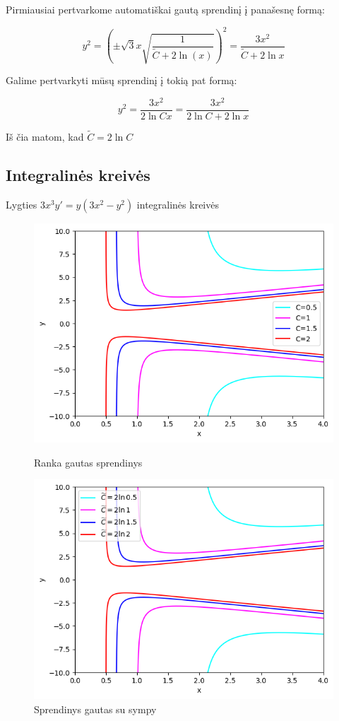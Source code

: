 \documentclass[11pt]{article}
\begin{document}
Pirmiausiai pertvarkome automatiškai gautą sprendinį į panašesnę formą:

\begin{equation}
y^2=\left(\pm\sqrt 3x\sqrt{\frac{1}{\widetilde{C}+2\ln(x)}}\right)^2=\frac{3x^2}{\widetilde{C}+2\ln x}
\end{equation}

Galime pertvarkyti mūsų sprendinį į tokią pat formą:

\begin{equation}
y^2=\frac{3x^2}{2\ln Cx}=\frac{3x^2}{2\ln C + 2\ln x}
\end{equation}

Iš čia matom, kad $\widetilde{C}=2\ln C$

\newpage
\subsection{Integralinės kreivės}

Lygties $3x^3y'=y(3x^2-y^2)$ integralinės kreivės

\begin{figure}[h!]
    \centering
    \begin{minipage}{0.75\textwidth}
        \centering
        \includegraphics[width=.7\linewidth]{2-updated-my.png}
        \caption{Ranka gautas sprendinys}\label{fig:pvz2}
    \end{minipage}\hfill

    \begin{minipage}{0.75\textwidth}
        \centering
        \includegraphics[width=.7\linewidth]{2-updated-sympy.png}
        \caption{Sprendinys gautas su sympy}\label{fig:pvz3}
    \end{minipage}
\end{figure}
\end{document}
